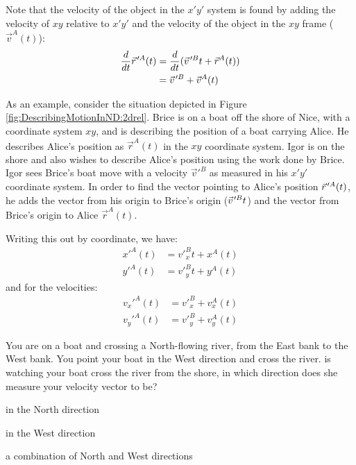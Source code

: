 Note that the velocity of the object in the $x'y'$ system is found by adding the velocity of $xy$ relative to $x'y'$ and the velocity of the object in the $xy$ frame ($\vec v^A(t)$):
\begin{align*}
\frac{d}{dt}\pvec r'^A(t) &=\frac{d}{dt}(\pvec v'^Bt+\vec r^A(t))\\
&=\pvec v'^B+\vec v^A(t)
\end{align*}

As an example, consider the situation depicted in Figure \ref{fig:DescribingMotionInND:2drel}. Brice is on a boat off the shore of Nice, with a coordinate system $xy$, and is describing the position of a boat carrying Alice. He describes Alice's position as $\vec r^A(t)$ in the $xy$ coordinate system. Igor is on the shore and also wishes to describe Alice's position using the work done by Brice. Igor sees Brice's boat move with a velocity $\vec v'^B$ as measured in his $x'y'$ coordinate system. In order to find the vector pointing to Alice's position $\pvec r'^A(t)$, he adds the vector from his origin to Brice's origin ($\pvec v'^B t$) and the vector from Brice's origin to Alice $\vec r^A(t)$.


Writing this out by coordinate, we have:
\begin{align*}
x'^A(t)&=v'^B_xt+x^A(t)\\
y'^A(t)&=v'^B_yt+y^A(t)
\end{align*}
and for the velocities:
\begin{align*}
v_x'^A(t)&=v'^B_x+v_x^A(t)\\
v_y'^A(t)&=v'^B_y+v_y^A(t)
\end{align*}


\begin{checkpoint}{\begin{MCquestion}{You are on a boat and crossing a North-flowing river, from the East bank to the West bank. You point your boat in the West direction and cross the river. \chloe is watching your boat cross the river from the shore, in which direction does she measure your velocity vector to be?}
\item in the North direction
\item in the West direction
\item a combination of North and West directions
\end{MCquestion}}
\end{checkpoint}


